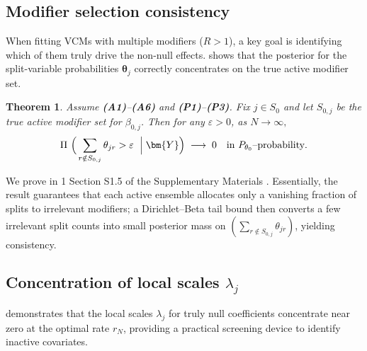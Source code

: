 \documentclass[11pt]{article}
\theoremstyle{plain}
\newtheorem{theorem}{Theorem}
\theoremstyle{definition}
\theoremstyle{plain}
\newcommand{\includesupp}{1}
\newcommand{\switchref}[2]{%
  \if\includesupp1%
    #1%
  \else%
    #2%
  \fi%
}
\begin{document}
\subsection{Modifier selection consistency}

When fitting VCMs with multiple modifiers ($R > 1$), a key goal is identifying which of them truly drive the non-null effects.
 shows that the posterior for the split-variable probabilities $\bm{\theta}_j$ correctly concentrates on the true active modifier set.

\begin{theorem}
\label{thm:modsel}
Assume \textbf{(A1)}–\textbf{(A6)} and \textbf{(P1)}–\textbf{(P3)}. Fix $j\in S_0$ and let
$S_{0,j}$ be the true active modifier set for $\beta_{0,j}$.
Then for any $\varepsilon>0$, as $N\to\infty,$
\[
\Pi \ \Big(\sum_{r\notin S_{0,j}} \theta_{jr} > \varepsilon\ \Bigm \vert \bm{Y}\Big)
\;\longrightarrow\; 0
\quad\text{in $P_{\theta_0}$–probability}. 
\]
\end{theorem}
We prove  in \switchref{}{Section S1.5 of the Supplementary Materials}.
Essentially, the result guarantees that each active ensemble allocates only a vanishing fraction of splits to irrelevant modifiers; a Dirichlet–Beta tail bound then converts a few irrelevant split counts into small posterior mass on $(\sum_{r\notin S_{0,j}}\theta_{jr})$, yielding consistency. 
\subsection{Concentration of local scales \texorpdfstring{\(\lambda_j\)}{lambda\_j}}
\label{sec:lambda-concentration}

 demonstrates that the local scales $\lambda_j$ for truly null coefficients concentrate near zero at the optimal rate $r_N$, providing a practical screening device to identify inactive covariates.
\end{document}
